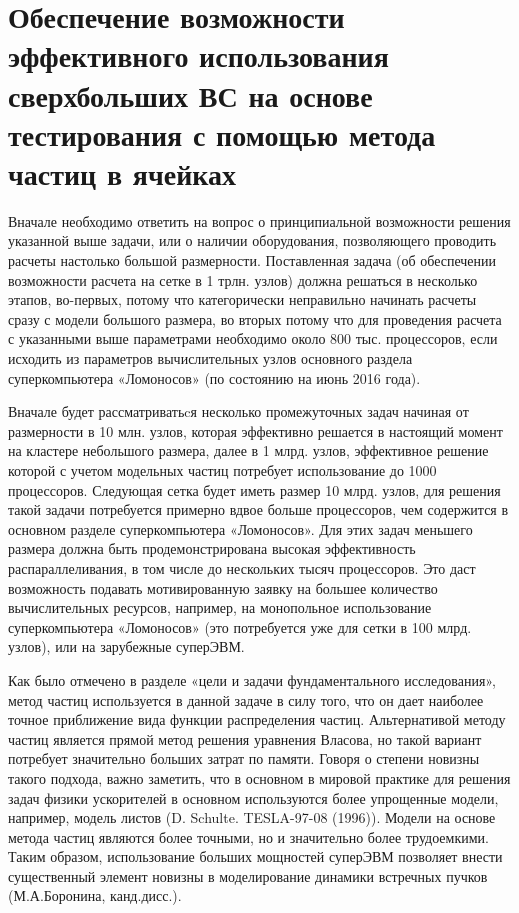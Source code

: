         
        \section{Обеспечение возможности эффективного использования сверхбольших ВС на основе тестирования с помощью метода частиц в ячейках}
        
        Вначале необходимо ответить на вопрос о принципиальной возможности решения указанной выше задачи, или о наличии оборудования, позволяющего проводить расчеты настолько большой размерности. Поставленная задача (об обеспечении возможности расчета на сетке в 1 трлн. узлов) должна решаться в несколько этапов, во-первых, потому что категорически неправильно начинать расчеты сразу с модели большого размера, во вторых потому что для проведения расчета с указанными выше параметрами необходимо около 800 тыс. процессоров, если исходить из параметров вычислительных узлов основного раздела суперкомпьютера «Ломоносов» (по состоянию на июнь 2016 года).
        
        Вначале будет рассматриватьcя несколько промежуточных задач начиная от размерности в 10 млн. узлов, которая эффективно решается в настоящий момент на кластере небольшого размера, далее в 1 млрд. узлов, эффективное решение которой с учетом модельных частиц потребует использование до 1000 процессоров. Следующая сетка будет иметь размер 10 млрд. узлов, для решения такой задачи потребуется примерно вдвое больше процессоров, чем содержится в основном разделе суперкомпьютера «Ломоносов». Для этих задач меньшего размера должна быть продемонстрирована высокая эффективность распараллеливания, в том числе до нескольких тысяч процессоров. Это даст возможность подавать мотивированную заявку на большее количество вычислительных ресурсов, например, на монопольное использование суперкомпьютера «Ломоносов» (это потребуется уже для сетки в 100 млрд. узлов), или на зарубежные суперЭВМ.
        
        Как было отмечено в разделе «цели и задачи фундаментального исследования», метод частиц используется в данной задаче в силу того, что он дает наиболее точное приближение вида функции распределения частиц. Альтернативой методу частиц является прямой метод решения уравнения Власова, но такой вариант потребует значительно больших затрат по памяти. Говоря о степени новизны такого подхода, важно заметить, что в основном в мировой практике для решения задач физики ускорителей в основном используются более упрощенные модели, например, модель листов (D. Schulte. TESLA-97-08 (1996)). Модели на основе метода частиц являются более точными, но и значительно более трудоемкими. Таким образом, использование больших мощностей суперЭВМ позволяет внести существенный элемент новизны в моделирование динамики встречных пучков (М.А.Боронина, канд.дисс.).
        

